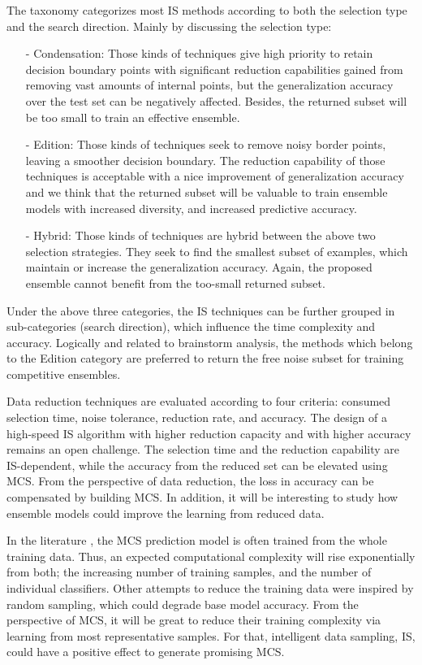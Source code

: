 The taxonomy \cite{garcia2011} categorizes most IS methods according to both the selection type and the search direction. Mainly by discussing the selection type:  
\begin{itemize}[nosep]
    \item[-] Condensation: Those kinds of techniques give high priority to retain decision boundary points with significant reduction capabilities gained from removing vast amounts of internal points, but the generalization accuracy over the test set can be negatively affected. Besides, the returned subset will be too small to train an effective ensemble.  
    \item[-] Edition: Those kinds of techniques seek to remove noisy border points, leaving a smoother decision boundary. The reduction capability of those techniques is acceptable with a nice improvement of generalization accuracy and we think that the returned subset will be valuable to train ensemble models with increased diversity, and increased predictive accuracy.
    \item[-] 	Hybrid: Those kinds of techniques are hybrid between the above two selection strategies. They seek to find the smallest subset of examples, which maintain or increase the generalization accuracy. Again, the proposed ensemble cannot benefit from the too-small returned subset. 
\end{itemize}


Under the above three categories, the IS techniques can be further grouped in sub-categories (search direction), which influence the time complexity and accuracy. Logically and related to brainstorm analysis, the methods which belong to the Edition category are preferred to return the free noise subset for training competitive ensembles.

Data reduction techniques are evaluated according to four criteria: consumed selection time, noise tolerance, reduction rate, and accuracy. The design of a high-speed IS algorithm with higher reduction capacity and with higher accuracy remains an open challenge. The selection time and the reduction capability are IS-dependent, while the accuracy from the reduced set can be elevated using MCS. From the perspective of data reduction, the loss in accuracy can be compensated by building MCS. In addition, it will be interesting to study how ensemble models could improve the learning from reduced data. 


In the literature \cite{kuncheva2014a,sikora2015,aburomman2016,onan2016,geurts2006,friedman2001g,blaser2016,friedman2000}, the MCS prediction model is often trained from the whole training data. Thus, an expected computational complexity will rise exponentially from both; the increasing number of training samples, and the number of individual classifiers. Other attempts to reduce the training data were inspired by random sampling, which could degrade base model accuracy. From the perspective of MCS, it will be great to reduce their training complexity via learning from most representative samples. For that, intelligent data sampling, IS, could have a positive effect to generate promising MCS.



